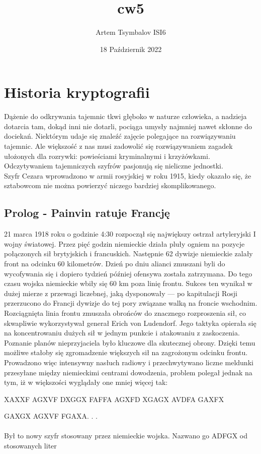 \documentclass[10pt, letterpaper, titlepage]{article}
\title{cw5}
\author{Artem Tsymbalov ISI6}
\date{18 Październik 2022}
\begin{document}
\section{ Historia kryptografii}
Dążenie do odkrywania tajemnic tkwi głęboko w naturze człowieka, a nadzieja dotarcia tam, dokąd
inni nie dotarli, pociąga umysły najmniej nawet skłonne do dociekań. Niektórym udaje się znaleźć
zajęcie polegające na rozwiązywaniu tajemnic. Ale większość z nas musi zadowolić się rozwiązywaniem zagadek ułożonych dla rozrywki: powieściami kryminalnymi i krzyżówkami. Odczytywaniem
tajemniczych szyfrów pasjonują się nieliczne jednostki.\\
Szyfr Cezara wprowadzono w armii rosyjskiej w roku 1915, kiedy okazało się, że sztabowcom nie
można powierzyć niczego bardziej skomplikowanego.
\subsection{Prolog - Painvin ratuje Francję}
21 marca 1918 roku o godzinie 4:30 rozpoczął się największy ostrzał artyleryjski I wojny światowej. Przez pięć godzin niemieckie działa pluły ogniem na pozycje połączonych sił brytyjskich
i francuskich. Następnie 62 dywizje niemieckie zalały front na odcinku 60 kilometrów. Dzień po
dniu alianci zmuszani byli do wycofywania się i dopiero tydzień później ofensywa została zatrzymana. Do tego czasu wojska niemieckie wbiły się 60 km poza linię frontu. Sukces ten wynikał w
dużej mierze z przewagi liczebnej, jaką dysponowały — po kapitulacji Rosji przerzucono do Francji dywizje do tej pory związane walką na froncie wschodnim. Rozciągnięta linia frontu zmuszała
obrońców do znacznego rozproszenia sił, co skwapliwie wykorzystywał generał Erich von Ludendorf. Jego taktyka opierała się na koncentrowaniu dużych sił w jednym punkcie i atakowaniu z
zaskoczenia. Poznanie planów nieprzyjaciela było kluczowe dla skutecznej obrony. Dzięki temu
możliwe stałoby się zgromadzenie większych sił na zagrożonym odcinku frontu. Prowadzono więc
intensywny nasłuch radiowy i przechwytywano liczne meldunki przesyłane między niemieckimi centrami dowodzenia, problem polegał jednak na tym, iż w większości wyglądały one mniej więcej tak:\\
\par XAXXF AGXVF DXGGX FAFFA AGXFD XGAGX AVDFA GAXFX \par  GAXGX AGXVF FGAXA. . .\\
\\
Był to nowy szyfr stosowany przez niemieckie wojska. Nazwano go ADFGX od stosowanych liter
\end{document}

